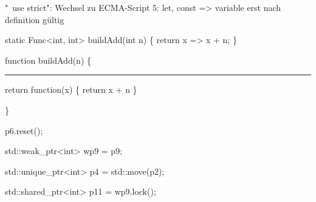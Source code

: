 
"\ use strict": Wechsel zu ECMA-Script 5: let, const => variable erst nach definition gültig

 static Func<int, int> buildAdd(int n) \{ return x => x + n; \}

function buildAdd(n) \{ 

\rule{1cm}{0cm}return function(x) \{ return x + n \} 

\}

 p6.reset(); 

std::weak\_ptr<int> wp9 = p9;

 std::unique\_ptr<int> p4 = std::move(p2); 

std::shared\_ptr<int> p11 = wp9.lock(); 



